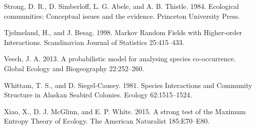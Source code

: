 \documentclass[12pt,]{article}
\begin{document}
\begin{spacing}{1.9}
\begin{flushleft}
Strong, D. R., D. Simberloff, L. G. Abele, and A. B. Thistle. 1984.
Ecological communities: Conceptual issues and the evidence. Princeton
University Press.

Tjelmeland, H., and J. Besag. 1998. Markov Random Fields with
Higher-order Interactions. Scandinavian Journal of Statistics
25:415--433.

Veech, J. A. 2013. A probabilistic model for analysing species
co-occurrence. Global Ecology and Biogeography 22:252--260.

Whittam, T. S., and D. Siegel-Causey. 1981. Species Interactions and
Community Structure in Alaskan Seabird Colonies. Ecology 62:1515--1524.

Xiao, X., D. J. McGlinn, and E. P. White. 2015. A strong test of the
Maximum Entropy Theory of Ecology. The American Naturalist 185:E70--E80.
\end{flushleft}
\end{spacing}
\end{document}
